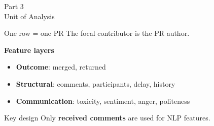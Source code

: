 \documentclass[aspectratio=169,11pt]{beamer}
\begin{document}
\begin{frame}{Part 3\\Unit of Analysis}

\begin{block}{One row = one PR}
The focal contributor is the PR author.
\end{block}

\vspace{0.4em}
\textbf{Feature layers}
\begin{itemize}
  \item \textbf{Outcome}: merged, returned
  \item \textbf{Structural}: comments, participants, delay, history
  \item \textbf{Communication}: toxicity, sentiment, anger, politeness
\end{itemize}

\vspace{0.4em}
\begin{exampleblock}{Key design}
Only \textbf{received comments} are used for NLP features.
\end{exampleblock}

\end{frame}
\end{document}
